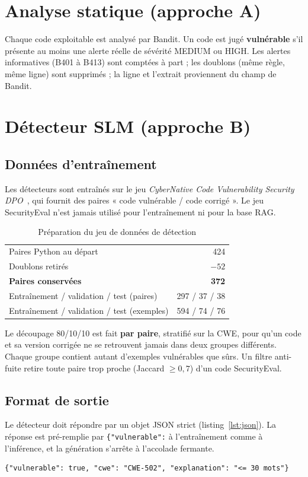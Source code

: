 \documentclass[11pt,a4paper,oneside]{report}
\newcommand{\code}[1]{\texttt{\detokenize{#1}}}
\begin{document}
\section{Analyse statique (approche A)}
Chaque code exploitable est analysé par Bandit. Un code est jugé \textbf{vulnérable} s'il présente au moins une alerte réelle de sévérité MEDIUM ou HIGH. Les alertes informatives (B401 à B413) sont comptées à part ; les doublons (même règle, même ligne) sont supprimés ; la ligne et l'extrait proviennent du champ \code{line_number} de Bandit.

\section{Détecteur SLM (approche B)}
\subsection{Données d'entraînement}
Les détecteurs sont entraînés sur le jeu \emph{CyberNative Code Vulnerability Security DPO}~\cite{cybernative}, qui fournit des paires « code vulnérable / code corrigé ». Le jeu SecurityEval n'est jamais utilisé pour l'entraînement ni pour la base RAG.

\begin{table}[H]
\centering
\caption{Préparation du jeu de données de détection}
\label{tab:dataset}
\begin{tabular}{@{}lr@{}}
\toprule
Paires Python au départ & 424 \\
Doublons retirés & $-52$ \\
\textbf{Paires conservées} & \textbf{372} \\
\midrule
Entraînement / validation / test (paires) & 297 / 37 / 38 \\
Entraînement / validation / test (exemples) & 594 / 74 / 76 \\
\bottomrule
\end{tabular}
\end{table}
Le découpage 80/10/10 est fait \textbf{par paire}, stratifié sur la CWE, pour qu'un code et sa version corrigée ne se retrouvent jamais dans deux groupes différents. Chaque groupe contient autant d'exemples vulnérables que sûrs. Un filtre anti-fuite retire toute paire trop proche (Jaccard $\geq 0{,}7$) d'un code SecurityEval.

\subsection{Format de sortie}
Le détecteur doit répondre par un objet JSON strict (listing~\ref{lst:json}). La réponse est pré-remplie par \texttt{\{"vulnerable":} à l'entraînement comme à l'inférence, et la génération s'arrête à l'accolade fermante.
\begin{lstlisting}[language={},numbers=none,caption={Format de réponse attendu du détecteur},label={lst:json}]
{"vulnerable": true, "cwe": "CWE-502", "explanation": "<= 30 mots"}
\end{lstlisting}
\end{document}
